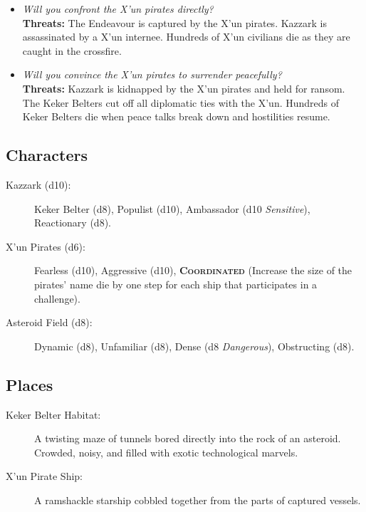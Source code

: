 \documentclass[11pt, a5paper, parskip=half-, DIV=12]{scrartcl}
\begin{document}
\begin{itemize}
	\item \textit{Will you confront the X'un pirates directly?} \\ \textbf{Threats:} The Endeavour is captured by the X'un pirates. Kazzark is assassinated by a X'un internee. Hundreds of X'un civilians die as they are caught in the crossfire.
	\item \textit{Will you convince the X'un pirates to surrender peacefully?} \\ \textbf{Threats:} Kazzark is kidnapped by the X'un pirates and held for ransom. The Keker Belters cut off all diplomatic ties with the X'un. Hundreds of Keker Belters die when peace talks break down and hostilities resume.
\end{itemize}

\newpage

\subsection*{Characters}
\begin{description}
	\item[Kazzark (d10):] Keker Belter (d8), Populist (d10), Ambassador (d10 \textit{Sensitive}), Reactionary (d8).
	\item[X'un Pirates (d6):] Fearless (d10), Aggressive (d10), \textbf{\textsc{Coordinated}} (Increase the size of the pirates' name die by one step for each ship that participates in a challenge).
	\item[Asteroid Field (d8):] Dynamic (d8), Unfamiliar (d8),  Dense (d8 \textit{Dangerous}), Obstructing (d8).
\end{description}

\subsection*{Places}
\begin{description}
	\item[Keker Belter Habitat:] A twisting maze of tunnels bored directly into the rock of an asteroid. Crowded, noisy, and filled with exotic technological marvels.
	\item[X'un Pirate Ship:] A ramshackle starship cobbled together from the parts of captured vessels. 
\end{description}
\end{document}
